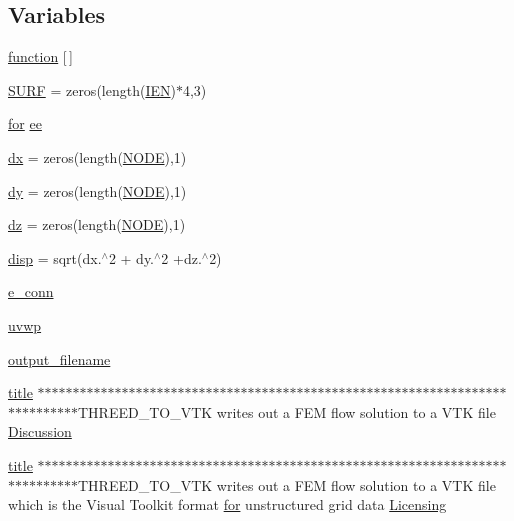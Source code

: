 \subsection*{Variables}
\begin{DoxyCompactItemize}
\item 
\hyperlink{a00611_a2420833d971716e9bab41cc9fb3abba1}{function} \mbox{[}$\,$\mbox{]}
\item 
\hyperlink{a00611_acc2cee21ea7e7da5015e0957c291ff80}{S\+U\+RF} = zeros(length(\hyperlink{a00608_ada37e689768b959686f183a3d534464b}{I\+EN})$\ast$4,3)
\item 
\hyperlink{a00623_ad1e7380d51df1e0043d24d3c8a860e0a}{for} \hyperlink{a00611_af3a3092fbb5f170a7baecf75fd1b29d2}{ee}
\item 
\hyperlink{a00611_aacddc911cdfe5cd5ec97b084754542d4}{dx} = zeros(length(\hyperlink{a00605_a28010846a3742b3c2c07f00b1f1536ff}{N\+O\+DE}),1)
\item 
\hyperlink{a00611_a22b1a06ae09d552a5ca668a07885ebf1}{dy} = zeros(length(\hyperlink{a00605_a28010846a3742b3c2c07f00b1f1536ff}{N\+O\+DE}),1)
\item 
\hyperlink{a00611_a71f0caccd6959b358543ee9cdc9b9c3e}{dz} = zeros(length(\hyperlink{a00605_a28010846a3742b3c2c07f00b1f1536ff}{N\+O\+DE}),1)
\item 
\hyperlink{a00611_a4e72583d972515f4f5e30d98ce1eb739}{disp} = sqrt(dx.$^\wedge$2 + dy.$^\wedge$2 +dz.$^\wedge$2)
\item 
\hyperlink{a00611_a4b51eee3b0df698c7db4e3d113502bc0}{e\+\_\+conn}
\item 
\hyperlink{a00611_a9c137ebda5c84e833481db1dd6531003}{uvwp}
\item 
\hyperlink{a00611_a5934d690c688edbd92210f38fe5855e7}{output\+\_\+filename}
\item 
\hyperlink{a00617_a051e403214cb6872ad3fe4e50302a6ee}{title} $\ast$$\ast$$\ast$$\ast$$\ast$$\ast$$\ast$$\ast$$\ast$$\ast$$\ast$$\ast$$\ast$$\ast$$\ast$$\ast$$\ast$$\ast$$\ast$$\ast$$\ast$$\ast$$\ast$$\ast$$\ast$$\ast$$\ast$$\ast$$\ast$$\ast$$\ast$$\ast$$\ast$$\ast$$\ast$$\ast$$\ast$$\ast$$\ast$$\ast$$\ast$$\ast$$\ast$$\ast$$\ast$$\ast$$\ast$$\ast$$\ast$$\ast$$\ast$$\ast$$\ast$$\ast$$\ast$$\ast$$\ast$$\ast$$\ast$$\ast$$\ast$$\ast$$\ast$$\ast$$\ast$$\ast$$\ast$$\ast$$\ast$$\ast$$\ast$$\ast$$\ast$$\ast$$\ast$$\ast$$\ast$T\+H\+R\+E\+E\+D\+\_\+\+T\+O\+\_\+\+V\+TK writes out a F\+EM flow solution to a V\+TK file \hyperlink{a00611_afb022d1087d237270af4fbdcc4cce30e}{Discussion}
\item 
\hyperlink{a00617_a051e403214cb6872ad3fe4e50302a6ee}{title} $\ast$$\ast$$\ast$$\ast$$\ast$$\ast$$\ast$$\ast$$\ast$$\ast$$\ast$$\ast$$\ast$$\ast$$\ast$$\ast$$\ast$$\ast$$\ast$$\ast$$\ast$$\ast$$\ast$$\ast$$\ast$$\ast$$\ast$$\ast$$\ast$$\ast$$\ast$$\ast$$\ast$$\ast$$\ast$$\ast$$\ast$$\ast$$\ast$$\ast$$\ast$$\ast$$\ast$$\ast$$\ast$$\ast$$\ast$$\ast$$\ast$$\ast$$\ast$$\ast$$\ast$$\ast$$\ast$$\ast$$\ast$$\ast$$\ast$$\ast$$\ast$$\ast$$\ast$$\ast$$\ast$$\ast$$\ast$$\ast$$\ast$$\ast$$\ast$$\ast$$\ast$$\ast$$\ast$$\ast$$\ast$T\+H\+R\+E\+E\+D\+\_\+\+T\+O\+\_\+\+V\+TK writes out a F\+EM flow solution to a V\+TK file which is the Visual Toolkit format \hyperlink{a00623_ad1e7380d51df1e0043d24d3c8a860e0a}{for} unstructured grid data \hyperlink{a00611_aee3fdff7ffc0b9af36278d9aa4cec65b}{Licensing}

\end{DoxyCompactItemize}
